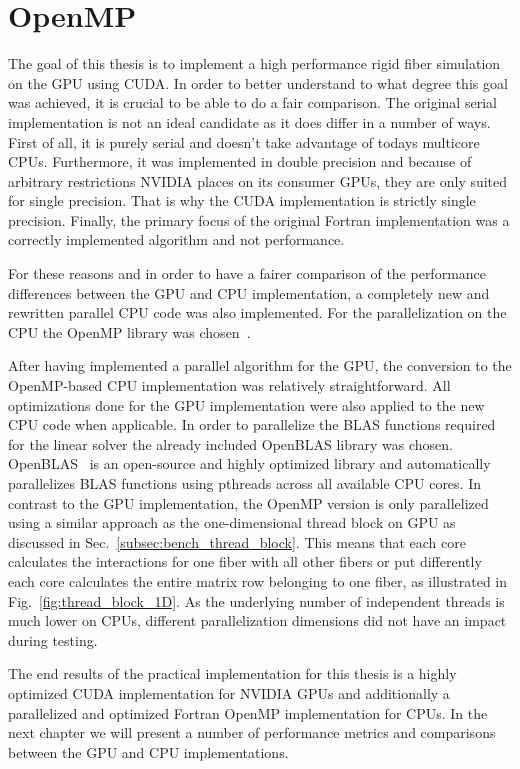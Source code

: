 \section{OpenMP}

The goal of this thesis is to implement a high performance rigid fiber simulation on the GPU using CUDA. In order to better understand to what degree this goal was achieved, it is crucial to be able to do a fair comparison. The original serial implementation is not an ideal candidate as it does differ in a number of ways. First of all, it is purely serial and doesn't take advantage of todays multicore CPUs. Furthermore, it was implemented in double precision and because of arbitrary restrictions NVIDIA places on its consumer GPUs, they are only suited for single precision. That is why the CUDA implementation is strictly single precision. Finally, the primary focus of the original Fortran implementation was a correctly implemented algorithm and not performance.

For these reasons and in order to have a fairer comparison of the performance differences between the GPU and CPU implementation, a completely new and rewritten parallel CPU code was also implemented. For the parallelization on the CPU the OpenMP library was chosen~\cite{OpenMP}.

After having implemented a parallel algorithm for the GPU, the conversion to the OpenMP-based CPU implementation was relatively straightforward. All optimizations done for the GPU implementation were also applied to the new CPU code when applicable. In order to parallelize the BLAS functions required for the linear solver the already included OpenBLAS library was chosen. OpenBLAS~\cite{OpenBLAS} is an open-source and highly optimized library and automatically parallelizes BLAS functions using pthreads across all available CPU cores. In contrast to the GPU implementation, the OpenMP version is only parallelized using a similar approach as the one-dimensional thread block on GPU as discussed in Sec.~\ref{subsec:bench_thread_block}. This means that each core calculates the interactions for one fiber with all other fibers or put differently each core calculates the entire matrix row belonging to one fiber, as illustrated in Fig.~\ref{fig:thread_block_1D}. As the underlying number of independent threads is much lower on CPUs, different parallelization dimensions did not have an impact during testing.

The end results of the practical implementation for this thesis is a highly optimized CUDA implementation for NVIDIA GPUs and additionally a parallelized and optimized Fortran OpenMP implementation for CPUs. In the next chapter we will present a number of performance metrics and comparisons between the GPU and CPU implementations.
